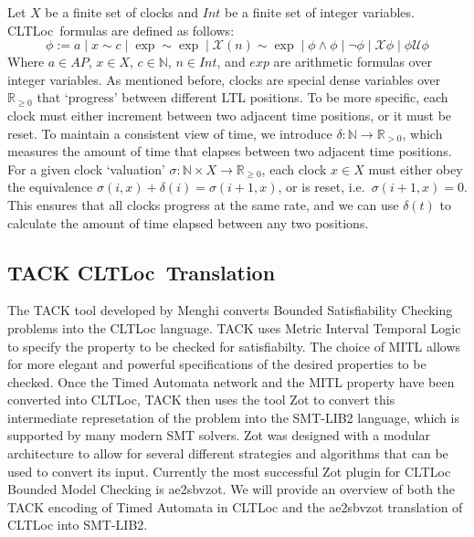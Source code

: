 \documentclass[a4paper,12pt]{article}
\newcommand*\BitOr{\mathbin{|}}
\newcommand{\cltloc}{CLTLoc}
\begin{document}
Let \(X\) be a finite set of clocks and \(Int\) be a finite set of integer
variables. \cltloc\ formulas are defined as follows:
\[\phi := a \BitOr x \sim c \BitOr \exp \sim \exp \BitOr \mathcal{X}(n) \sim \exp \BitOr \phi \land \phi \BitOr \neg \phi \BitOr \mathcal{X}\phi \BitOr \phi \mathcal{U} \phi \]
Where \(a \in AP\), \(x \in X\), \(c \in \mathbb{N}\), \(n \in Int\), and
\(exp\) are arithmetic formulas over integer variables. As mentioned before,
clocks are special dense variables over \(\mathbb{R}_{\geq 0}\) that `progress'
between different LTL positions. To be more specific, each clock must either
increment between two adjacent time positions, or it must be reset. To maintain
a consistent view of time, we introduce
\(\delta: \mathbb{N} \rightarrow \mathbb{R}_{>0}\), which measures the amount of
time that elapses between two adjacent time positions. For a given clock
`valuation' \(\sigma: \mathbb{N} \times X \rightarrow \mathbb{R}_{\geq 0}\),
each clock \(x \in X\) must either obey the equivalence
\(\sigma(i,x) + \delta(i) = \sigma(i+1,x)\), or is reset, i.e.\
\(\sigma(i+1,x) = 0\). This ensures that all clocks progress at the same rate,
and we can use \(\delta(t)\) to calculate the amount of time elapsed between any
two positions.

\subsection{TACK \cltloc\ Translation}\label{prelim-tack}

The TACK tool developed by Menghi converts Bounded Satisfiability Checking
problems into the CLTLoc language. TACK uses Metric Interval Temporal Logic to
specify the property to be checked for satisfiabilty. The choice of MITL allows
for more elegant and powerful specifications of the desired properties to be
checked. Once the Timed Automata network and the MITL property have been
converted into CLTLoc, TACK then uses the tool Zot to convert this intermediate
represetation of the problem into the SMT-LIB2 language, which is supported by
many modern SMT solvers. Zot was designed with a modular architecture to allow
for several different strategies and algorithms that can be used to convert its
input. Currently the most successful Zot plugin for CLTLoc Bounded Model
Checking is ae2sbvzot. We will provide an overview of both the TACK encoding of
Timed Automata in CLTLoc and the ae2sbvzot translation of CLTLoc into SMT-LIB2.
\end{document}
